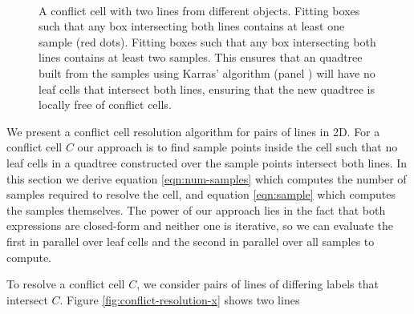 \documentclass[submission]{gmp2017}
\begin{document}
\begin{figure}
  \centering
   \\
  \caption{
    \protect{} A conflict cell with two lines from different objects.
    \protect{} Fitting boxes such that any box intersecting both lines contains at least one sample (red dots).
    \protect{} Fitting boxes such that any box intersecting both lines contains at least two samples. This ensures that an quadtree built from the samples using Karras' algorithm (panel \protect{}) will have no leaf cells that intersect both lines, ensuring that the new quadtree is locally free of conflict cells.
  }
  \label{fig:conflict-resolution}
\end{figure}

We present a conflict cell resolution algorithm for pairs of lines in 2D. For a conflict cell $C$ our approach is to find sample points inside the cell such that no leaf cells in a quadtree constructed over the sample points intersect both lines. In this section we derive equation \eqref{eqn:num-samples} which computes the number of samples required to resolve the cell, and equation \eqref{eqn:sample} which computes the samples themselves. The power of our approach lies in the fact that both expressions are closed-form and neither one is iterative, so we can evaluate the first in parallel over leaf cells and the second in parallel over all samples to compute.

To resolve a conflict cell $C$, we consider pairs of lines of differing labels that intersect $C$. Figure \ref{fig:conflict-resolution-x} shows two lines
\end{document}
